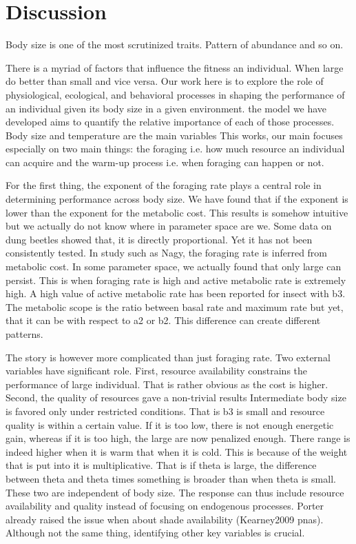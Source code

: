 \section*{Discussion}
% 
Body size is one of the most scrutinized traits.
Pattern of abundance and so on.

There is a myriad of factors that influence the fitness an individual.
When large do better than small and vice versa.
Our work here is to explore the role of physiological, ecological, and behavioral processes in shaping the performance of an individual given its body size in a given environment.
the model we have developed aims to quantify the relative importance of each of those processes.
Body size and temperature are the main variables
This works, our main focuses especially on two main things: the foraging i.e. how much resource an individual can acquire and the warm-up process i.e. when foraging can happen or not.


For the first thing, the exponent of the foraging rate plays a central role in determining performance across body size.
We have found that if the exponent is lower than the exponent for the metabolic cost.
This results is somehow intuitive but we actually do not know where in parameter space are we.
Some data on dung beetles showed that, it is directly proportional.
Yet it has not been consistently tested.
In study such as Nagy, the foraging rate is inferred from metabolic cost.
In some parameter space, we actually found that only large can persist. 
This is when foraging rate is high and active metabolic rate is extremely high.
A high value of active metabolic rate has been reported for insect with b3. 
The metabolic scope is the ratio between basal rate and maximum rate but yet, that it can be with respect to a2 or b2.
This difference can create different patterns.

 The story is however more complicated than just foraging rate.
 Two external variables have significant role.
 First,  resource availability constrains the performance of large individual.
 That is rather obvious as the cost is higher.
 Second, the quality of resources gave a non-trivial results
 Intermediate body size is favored only under restricted conditions. 
 That is b3 is small and resource quality is within a certain value.
 If it is too low, there is not enough energetic gain, whereas if it is too high, the large are now penalized enough.
 There range is indeed higher when it is warm that when it is cold. 
 This is because of the weight that is put into it is multiplicative. 
 That is if theta is large, the difference between theta and theta times something is broader than when theta is small.
 These two are independent of body size. 
 The response can thus include resource availability and quality instead of focusing on endogenous processes.
 Porter already raised the issue when about shade availability (Kearney2009 pnas).
 Although not the same thing, identifying other key variables is crucial.

